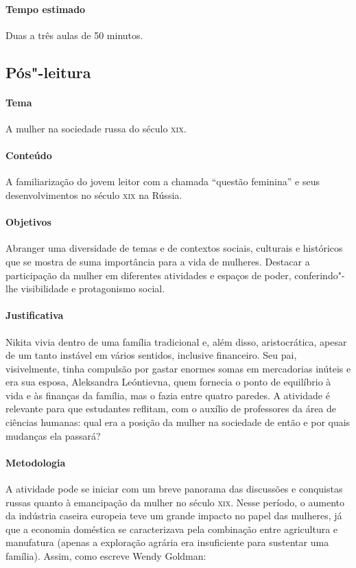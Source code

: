\documentclass[11pt]{extarticle}
\begin{document}
\paragraph{Tempo estimado} Duas a três aulas de 50 minutos.


\subsection{Pós"-leitura}

\paragraph{Tema} A mulher na sociedade russa do século \textsc{xix}.




\paragraph{Conteúdo}
A familiarização do jovem leitor com a chamada ``questão feminina'' e
seus desenvolvimentos no século \textsc{xix} na Rússia.

\paragraph{Objetivos}
Abranger uma diversidade de temas e de contextos sociais, culturais e
históricos que se mostra de suma importância para a vida de mulheres.
Destacar a participação da mulher em diferentes atividades e espaços de
poder, conferindo"-lhe visibilidade e protagonismo social.

\paragraph{Justificativa}
Nikita vivia dentro de uma família tradicional e, além disso,
aristocrática, apesar de um tanto instável em vários sentidos, inclusive
financeiro. Seu pai, visivelmente, tinha compulsão por gastar enormes
somas em mercadorias inúteis e era sua esposa, Aleksandra Leóntievna,
quem fornecia o ponto de equilíbrio à vida e às finanças da família, mas
o fazia entre quatro paredes. A atividade é relevante para que
estudantes reflitam, com o auxílio de professores da área de ciências humanas: qual era a posição da mulher na sociedade de então
e por quais mudanças ela passará?

\paragraph{Metodologia}
A atividade pode se iniciar com um breve panorama das discussões e
conquistas russas quanto à emancipação da mulher no século \textsc{xix}. Nesse
período, o aumento da indústria caseira europeia teve um grande impacto
no papel das mulheres, já que a economia doméstica se caracterizava pela
combinação entre agricultura e manufatura (apenas a exploração agrária
era insuficiente para sustentar uma família). Assim, como escreve Wendy
Goldman:
\end{document}
